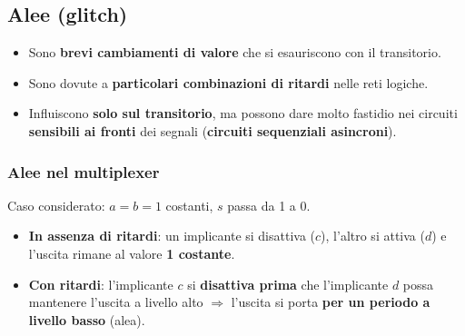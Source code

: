 \documentclass[12pt, a4paper]{article}
\begin{document}
\subsection{Alee (glitch)}

\begin{itemize}
    \item Sono \textbf{brevi cambiamenti di valore} che si esauriscono con il transitorio.
    \item Sono dovute a \textbf{particolari combinazioni di ritardi} nelle reti logiche.
    \item Influiscono \textbf{solo sul transitorio}, ma possono dare molto fastidio nei circuiti \textbf{sensibili ai fronti} dei segnali (\textbf{circuiti sequenziali asincroni}).
\end{itemize}

\subsubsection{Alee nel multiplexer}

Caso considerato: $a = b = 1$ costanti, $s$ passa da 1 a 0.

\begin{itemize}
    \item \textcolor{blue!70!black}{\textbf{In assenza di ritardi}}: un implicante si disattiva ($c$), l'altro si attiva ($d$) e l'uscita rimane al valore \textbf{1 costante}.
    \item \textcolor{red!80!black}{\textbf{Con ritardi}}: l'implicante $c$ si \textbf{disattiva prima} che l'implicante $d$ possa mantenere l'uscita a livello alto $\Rightarrow$ l'uscita si porta \textbf{per un periodo a livello basso} (alea).
\end{itemize}
\end{document}
